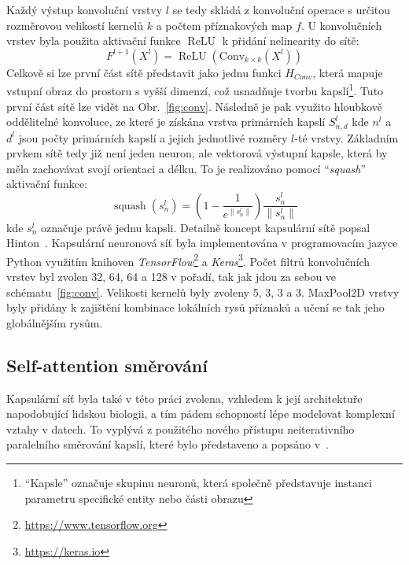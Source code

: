 Každý výstup konvoluční vrstvy $l$ se tedy skládá z konvoluční operace s určitou
rozměrovou velikostí kernelů $k$ a počtem příznakových map $f$. U konvolučních
vrstev byla použita aktivační funkce $\operatorname{ReLU}$ k přidání nelinearity
do sítě:
\begin{equation}
    F^{l+1}\left(X^l\right)=\operatorname{ReLU}\left(\text {Conv}_{k \times k}\left(X^l\right)\right)
\end{equation}
Celkově si lze první část sítě představit jako jednu funkci $H_{Conv}$, která
mapuje vstupní obraz do prostoru s vyšší dimenzí, což usnadňuje tvorbu
kapslí\footnote{\enquote{Kapsle} označuje skupinu neuronů, která společně
představuje instanci parametru specifické entity nebo části obrazu}. Tuto první
část sítě lze vidět na Obr.~\ref{fig:conv}. Následně je pak využito hloubkově
oddělitelné konvoluce, ze které je získána vrstva primárních kapslí $S_{n,d}^l$
kde $n^l$ a $d^l$ jsou počty primárních kapslí a jejich jednotlivé rozměry
$l$-té vrstvy. Základním prvkem sítě tedy již není jeden neuron, ale vektorová
výstupní kapsle, která by měla zachovávat svojí orientaci a délku. To je
realizováno pomocí \enquote{\textit{squash}} aktivační funkce:
\begin{equation}
    \operatorname{squash}\left(s_n^l\right)=\left(1-\frac{1}{e^{\left\|s_n^l\right\|}}\right) \frac{s_n^l}{\left\|s_n^l\right\|}
\end{equation}
kde $s_n^l$ označuje právě jednu kapsli. Detailně koncept kapsulární sítě popsal
Hinton~\cite{Hinton2011}. Kapsulární neuronová síť byla implementována v
programovacím jazyce Python využitím knihoven
\textit{TensorFlow}\footnote{\url{https://www.tensorflow.org}} a
\textit{Keras}\footnote{\url{https://keras.io}}. Počet filtrů konvolučních
vrstev byl zvolen 32, 64, 64 a 128 v pořadí, tak jak jdou za sebou ve
schématu~\ref{fig:conv}. Velikosti kernelů byly zvoleny 5, 3, 3 a 3. MaxPool2D
vrstvy byly přidány k zajištění kombinace lokálních rysů příznaků a učení se tak
jeho globálnějším rysům. 

\subsection{Self-attention směrování}
\label{subsec:dynamicke_smerovani}
Kapsulární síť byla také v této práci zvolena, vzhledem k její architektuře
napodobující lidskou biologii, a tím pádem schopností lépe modelovat komplexní
vztahy v datech. To vyplývá z použitého nového přístupu neiterativního
paralelního směrování kapslí, které bylo představeno a popsáno
v~\cite{Mazzia2021}.

